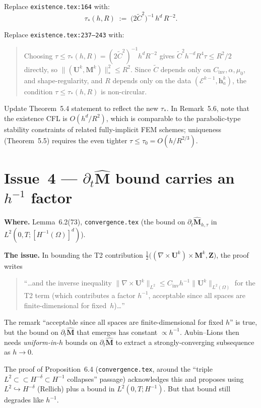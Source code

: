 \documentclass[11pt]{article}
\newcommand{\bM}{\mathbf{M}}
\newcommand{\bU}{\mathbf{U}}
\newcommand{\bZ}{\mathbf{Z}}
\newcommand{\bha}{\mathbf{h}_a}
\newcommand{\dt}{\tau}
\newcommand{\Ctilde}{\widetilde{C}}
\begin{document}
Replace \texttt{existence.tex:164} with:
\begin{equation*}
  \dt_{*}(h,R)\;:=\;\bigl(2\Ctilde^{2}\bigr)^{-1}\,h^{d}\,R^{-2}.
\end{equation*}

Replace \texttt{existence.tex:237--243} with:
\begin{quote}
Choosing $\dt\le\dt_{*}(h,R)=(2\Ctilde^{2})^{-1}h^{d}R^{-2}$ gives
$\Ctilde^{2}h^{-d}R^{4}\dt\le R^{2}/2$ directly, so
$\|(\bU^{k},\bM^{k})\|_{*}^{2}\le R^{2}$.  Since $\Ctilde$ depends
only on $C_{\mathrm{inv}},\alpha,\mu_{0}$, and shape-regularity, and
$R$ depends only on the data $(\mathcal{E}^{k-1},\bha^{k})$, the
condition $\dt\le\dt_{*}(h,R)$ is non-circular.
\end{quote}

Update Theorem~5.4 statement to reflect the new $\dt_{*}$.  In
Remark~5.6, note that the existence CFL is $O(h^{d}/R^{2})$, which
is comparable to the parabolic-type stability constraints of related
fully-implicit FEM schemes; uniqueness (Theorem~5.5) requires the
even tighter $\dt\le\dt_{0}=O(h/R^{2/3})$.

\section{Issue~4 --- $\partial_{t}\widehat{\bM}$ bound carries an $h^{-1}$
factor}

\textbf{Where.}  Lemma~6.2(73), \texttt{convergence.tex} (the bound on
$\partial_{t}\widehat{\bM}_{h,\dt}$ in $L^{2}(0,T;[H^{-1}(\Omega)]^{d})$).

\textbf{The issue.}  In bounding the T2 contribution
$\tfrac{1}{2}\bigl((\nabla\!\times\!\bU^{k})\times\bM^{k},\bZ\bigr)$,
the proof writes
\begin{quote}
``\dots and the inverse inequality
$\|\nabla\!\times\!\bU^{k}\|_{L^{2}}\le C_{\mathrm{inv}}h^{-1}
\|\bU^{k}\|_{L^{2}(\Omega)}$ for the T2 term (which contributes a
factor $h^{-1}$, acceptable since all spaces are finite-dimensional
for fixed~$h$)\dots''
\end{quote}

The remark ``acceptable since all spaces are finite-dimensional for
fixed $h$'' is true, but the bound on $\partial_{t}\widehat{\bM}$
that emerges has constant $\propto h^{-1}$.  Aubin--Lions then needs
\emph{uniform-in-}$h$ bounds on $\partial_{t}\widehat{\bM}$ to
extract a strongly-converging subsequence as $h\to 0$.

The proof of Proposition~6.4 (\texttt{convergence.tex}, around the
``triple $L^{2}\subset\subset H^{-\delta}\subset H^{-1}$ collapses''
passage) acknowledges this and proposes using
$L^{2}\hookrightarrow H^{-\delta}$ (Rellich) plus a bound in
$L^{2}(0,T;H^{-1})$.  But that bound still degrades like $h^{-1}$.
\end{document}
